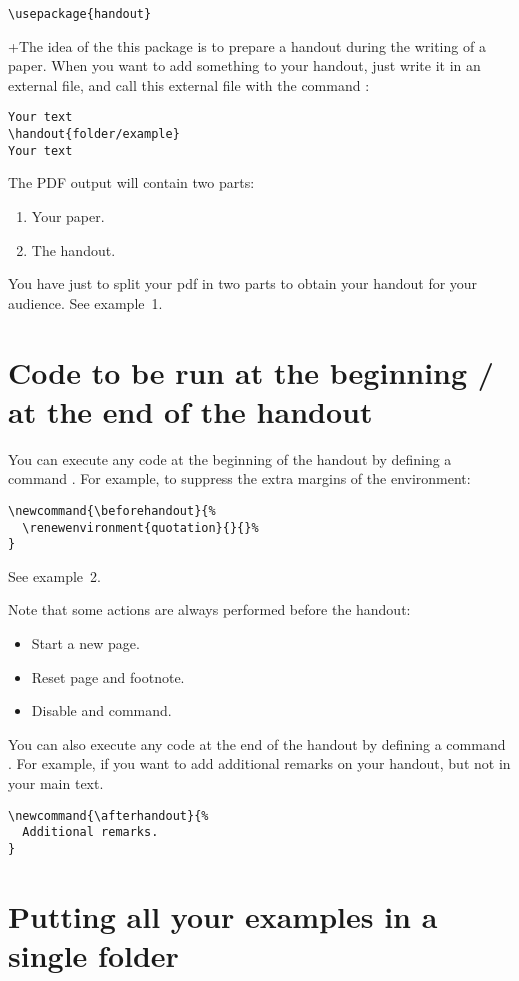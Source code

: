 \documentclass{ltxdockit}[2011/03/25]
\begin{document}
\begin{verbatim}
\usepackage{handout}
\end{verbatim}
+The idea of the this package is to prepare a handout during the writing of a paper. When you want to add something to your handout, just write it in an external file, and call this external file with the command :

\begin{verbatim}
Your text
\handout{folder/example}
Your text
\end{verbatim}

The PDF output will contain two parts:
\begin{enumerate}
  \item Your paper.
  \item The handout.
\end{enumerate}

You have just to split your pdf in two parts to obtain your handout for your audience.
See example~1.

\section{Code to be run at the beginning / at the end of the handout}

You can execute any code at the beginning of the handout by defining a command . For example, to suppress the extra margins of the  environment:
\begin{verbatim}
\newcommand{\beforehandout}{%
  \renewenvironment{quotation}{}{}%
}
\end{verbatim}
See example~2.

Note that some actions are always performed before the handout:
\begin{itemize}
  \item Start a new page.
  \item Reset page and footnote.
  \item Disable  and  command.
\end{itemize}

You can also execute any code at the end of the handout by defining a command .
 For example, if you want to add additional remarks on your handout, but not in your main text.
\begin{verbatim}
\newcommand{\afterhandout}{%
  Additional remarks.
}
\end{verbatim}
\section{Putting all your examples in a single folder}
\end{document}
